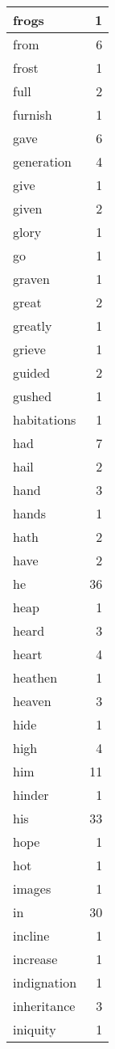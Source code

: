 \begin{center}
\begin{longtable}{l|r}
frogs & 1\\ \hline 
from & 6\\ \hline 
frost & 1\\ \hline 
full & 2\\ \hline 
furnish & 1\\ \hline 
gave & 6\\ \hline 
generation & 4\\ \hline 
give & 1\\ \hline 
given & 2\\ \hline 
glory & 1\\ \hline 
go & 1\\ \hline 
graven & 1\\ \hline 
great & 2\\ \hline 
greatly & 1\\ \hline 
grieve & 1\\ \hline 
guided & 2\\ \hline 
gushed & 1\\ \hline 
habitations & 1\\ \hline 
had & 7\\ \hline 
hail & 2\\ \hline 
hand & 3\\ \hline 
hands & 1\\ \hline 
hath & 2\\ \hline 
have & 2\\ \hline 
he & 36\\ \hline 
heap & 1\\ \hline 
heard & 3\\ \hline 
heart & 4\\ \hline 
heathen & 1\\ \hline 
heaven & 3\\ \hline 
hide & 1\\ \hline 
high & 4\\ \hline 
him & 11\\ \hline 
hinder & 1\\ \hline 
his & 33\\ \hline 
hope & 1\\ \hline 
hot & 1\\ \hline 
images & 1\\ \hline 
in & 30\\ \hline 
incline & 1\\ \hline 
increase & 1\\ \hline 
indignation & 1\\ \hline 
inheritance & 3\\ \hline 
iniquity & 1\\ \hline 

\end{longtable}
\end{center}
